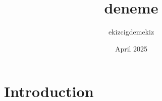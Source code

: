 \documentclass{article}
\title{deneme}
\author{ekizcigdemekiz }
\date{April 2025}
\begin{document}
\maketitle

\section{Introduction}

\end{document}
